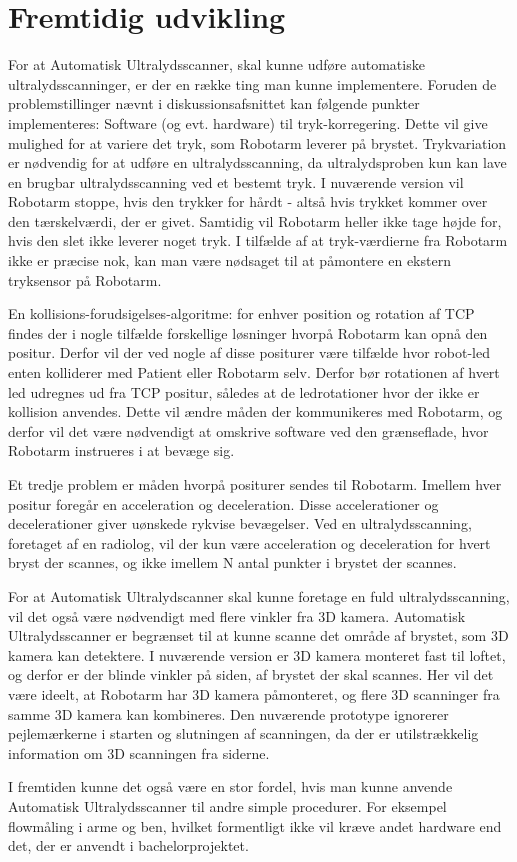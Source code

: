 \chapter{Fremtidig udvikling}\label{kapitel_Fremtidig udvikling}
For at Automatisk Ultralydsscanner, skal kunne udføre automatiske ultralydsscanninger, er der en række ting man kunne implementere. Foruden de problemstillinger nævnt i diskussionsafsnittet kan følgende punkter implementeres:
Software (og evt. hardware) til tryk-korregering. Dette vil give mulighed for at variere det tryk, som Robotarm leverer på brystet. Trykvariation er nødvendig for at udføre en ultralydsscanning, da ultralydsproben kun kan lave en brugbar ultralydsscanning ved et bestemt tryk. I nuværende version vil Robotarm stoppe, hvis den trykker for hårdt - altså hvis trykket kommer over den tærskelværdi, der er givet. Samtidig vil Robotarm heller ikke tage højde for, hvis den slet ikke leverer noget tryk. I tilfælde af at tryk-værdierne fra Robotarm ikke er præcise nok, kan man være nødsaget til at påmontere en ekstern tryksensor på Robotarm.

En kollisions-forudsigelses-algoritme: for enhver position og rotation af TCP findes der i nogle tilfælde forskellige løsninger hvorpå Robotarm kan opnå den positur. Derfor vil der ved nogle af disse positurer være tilfælde hvor robot-led enten kolliderer med Patient eller Robotarm selv. Derfor bør rotationen af hvert led udregnes ud fra TCP positur, således at de ledrotationer hvor der ikke er kollision anvendes. Dette vil ændre måden der kommunikeres med Robotarm, og derfor vil det være nødvendigt at omskrive software ved den grænseflade, hvor Robotarm instrueres i at bevæge sig.

Et tredje problem er måden hvorpå positurer sendes til Robotarm. Imellem hver positur foregår en acceleration og deceleration. Disse accelerationer og decelerationer giver uønskede rykvise bevægelser. Ved en ultralydsscanning, foretaget af en radiolog, vil der kun være acceleration og deceleration for hvert bryst der scannes, og ikke imellem N antal punkter i brystet der scannes.

For at Automatisk Ultralydscanner skal kunne foretage en fuld ultralydsscanning, vil det også være nødvendigt med flere vinkler fra 3D kamera. Automatisk Ultralydsscanner er begrænset til at kunne scanne det område af brystet, som 3D kamera kan detektere. I nuværende version er 3D kamera monteret fast til loftet, og derfor er der blinde vinkler på siden, af brystet der skal scannes. Her vil det være ideelt, at Robotarm har 3D kamera påmonteret, og flere 3D scanninger fra samme 3D kamera kan kombineres. Den nuværende prototype ignorerer pejlemærkerne i starten og slutningen af scanningen, da der er utilstrækkelig information om 3D scanningen fra siderne.

I fremtiden kunne det også være en stor fordel, hvis man kunne anvende Automatisk Ultralydsscanner til andre simple procedurer. For eksempel flowmåling i arme og ben, hvilket formentligt ikke vil kræve andet hardware end det, der er anvendt i bachelorprojektet.